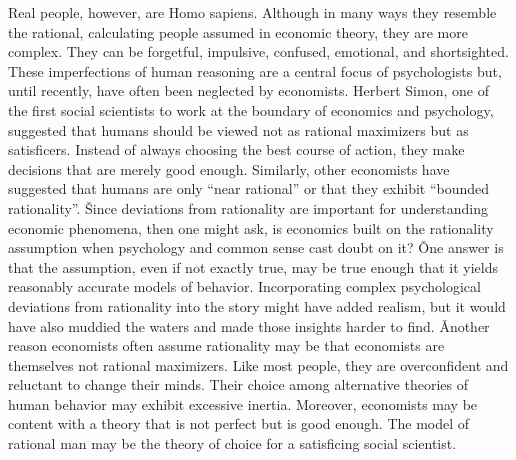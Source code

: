 Real people, however, are Homo sapiens. Although in many ways they resemble the rational, calculating people assumed
in economic theory, they are more complex. They can be forgetful, impulsive, confused, emotional, and shortsighted.
These imperfections of human reasoning are a central focus of psychologists but, until recently, have often been
neglected by economists. Herbert Simon, one of the first social scientists to work at the boundary of economics and
psychology, suggested that humans should be viewed not as rational maximizers but as satisficers. Instead of always
choosing the best course of action, they make decisions that are merely good enough. Similarly, other economists have
suggested that humans are only ``near rational'' or that they exhibit ``bounded rationality''. \v

Since deviations from rationality are important for understanding economic phenomena, then one might ask, is
economics built on the rationality assumption when psychology and common sense cast doubt on it? \v

One answer is that the assumption, even if not exactly true, may be true enough that it yields reasonably accurate
models of behavior. Incorporating complex psychological deviations from rationality into the story might have added
realism, but it would have also muddied the waters and made those insights harder to find. \v

Another reason economists often assume rationality may be that economists are themselves not rational maximizers.
Like most people, they are overconfident and reluctant to change their minds. Their choice among alternative theories
of human behavior may exhibit excessive inertia. Moreover, economists may be content with a theory that is not
perfect but is good enough. The model of rational man may be the theory of choice for a satisficing social scientist.